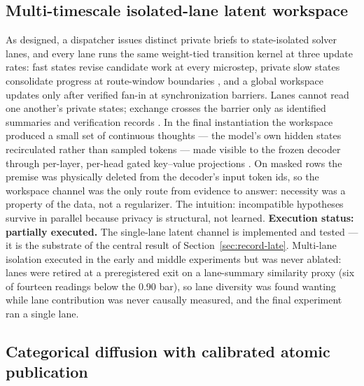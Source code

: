 \documentclass[10pt,a4paper]{article}
\begin{document}
\subsection{Multi-timescale isolated-lane latent workspace}

As designed, a dispatcher issues distinct private briefs to state-isolated
solver lanes, and every lane runs the same weight-tied transition kernel
\cite{graves2016,dehghani2019} at three update rates: fast states revise
candidate work at every microstep, private slow states consolidate progress
at route-window boundaries \cite{koutnik2014,chung2017}, and a global
workspace updates only after verified fan-in at synchronization barriers.
Lanes cannot read one another's private states; exchange crosses the barrier
only as identified summaries and verification records
\cite{chen2025parscale}. In the final instantiation the workspace produced a
small set of continuous thoughts --- the model's own hidden states
recirculated rather than sampled tokens \cite{coconut2024,codi2025} --- made
visible to the frozen decoder through per-layer, per-head gated key--value
projections \cite{eyuboglu2025cartridges,liu2026dualcache}. On masked rows
the premise was physically deleted from the decoder's input token ids, so
the workspace channel was the only route from evidence to answer: necessity
was a property of the data, not a regularizer. The intuition: incompatible
hypotheses survive in parallel because privacy is structural, not learned.
\textbf{Execution status: partially executed.} The single-lane latent
channel is implemented and tested --- it is the substrate of the central
result of Section~\ref{sec:record-late}. Multi-lane isolation executed in
the early and middle experiments but was never ablated: lanes were retired
at a preregistered exit on a lane-summary similarity proxy (six of fourteen
readings below the 0.90 bar), so lane diversity was found wanting while lane
contribution was never causally measured, and the final experiment ran a
single lane.

\subsection{Categorical diffusion with calibrated atomic publication}
\end{document}
